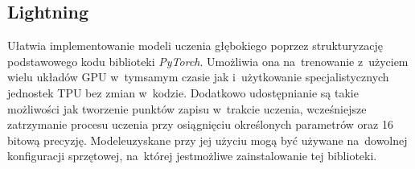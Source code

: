 \subsection*{Lightning}
Ułatwia implementowanie modeli uczenia głębokiego poprzez strukturyzację podstawowego kodu biblioteki \textit{PyTorch}. Umożliwia ona na~trenowanie z~użyciem wielu układów GPU w~tym\linebreak samym czasie jak i~użytkowanie specjalistycznych jednostek TPU bez zmian w~kodzie. Dodatkowo udostępnianie są takie możliwości jak tworzenie punktów zapisu w~trakcie uczenia, wcześniejsze zatrzymanie procesu uczenia przy osiągnięciu określonych parametrów oraz 16 bitową precyzję. Modele\linebreak uzyskane przy jej użyciu mogą być używane na~dowolnej konfiguracji sprzętowej, na~której jest\linebreak możliwe zainstalowanie tej biblioteki. 